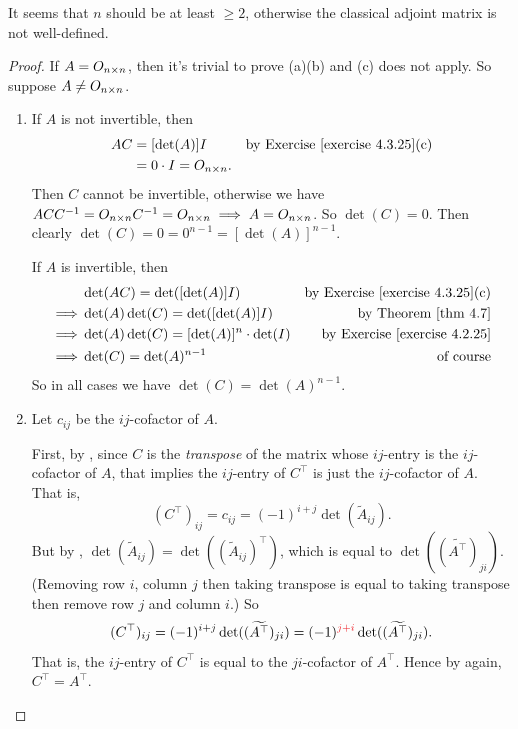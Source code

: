 \begin{note}
It seems that \(n\) should be at least \(\ge 2\), otherwise the classical adjoint matrix is not well-defined.
\end{note}

\begin{proof}
If \(A = O_{n \times n}\), then it's trivial to prove (a)(b) and (c) does not apply.
So suppose \(A \ne O_{n \times n}\).

\begin{enumerate}
\item If \(A\) is not invertible, then
\begin{align*}
    AC & = [\det(A)] I & \text{by \EXEC{4.3.25}(c)} \\
       & = 0 \cdot I = O_{n \X n}.
\end{align*}
Then \(C\) cannot be invertible, otherwise we have \(AC C^{-1} = O_{n \times n} C^{-1} = O_{n \times n} \implies A = O_{n \times n}\).
So \(\det(C) = 0\).
Then clearly \(\det(C) = 0 = 0^{n - 1} = [\det(A)]^{n - 1}\).

If \(A\) is invertible, then
\begin{align*}
             & \det(AC) = \det([\det(A)]I) & \text{by \EXEC{4.3.25}(c)} \\
    \implies & \det(A)\det(C) = \det([\det(A)]I) & \text{by \THM{4.7}} \\
    \implies & \det(A)\det(C) = [\det(A)]^n \cdot \det(I) & \text{by \EXEC{4.2.25}} \\
    \implies & \det(C) = \det(A)^{n - 1} & \text{of course}
\end{align*}
So in all cases we have \(\det(C) = \det(A)^{n - 1}\).

\item
Let \(c_{ij}\) be the \(ij\)-cofactor of \(A\).

First, by , since \(C\) is the \emph{transpose} of the matrix whose \(ij\)-entry is the \(ij\)-cofactor of \(A\), that implies the \(ij\)-entry of \(C^\top\) is just the \(ij\)-cofactor of \(A\).
That is,
\[
    (C^\top)_{ij} = c_{ij} = (-1)^{i + j} \det(\tilde{A}_{ij}).
\]
But by , \(\det(\tilde{A}_{ij}) = \det((\widetilde{A}_{ij})^\top)\), which is equal to \(\det((\widetilde{A^\top})_{ji} )\).
(Removing row \(i\), column \(j\) then taking transpose is equal to taking transpose then remove row \(j\) and column \(i\).)
So
\[
    (C^\top)_{ij} = (-1)^{i + j} \det( (\widetilde{A^\top})_{ji} ) = (-1)^{\RED{j + i}} \det( (\widetilde{A^\top})_{ji} ).
\]
That is, the \(ij\)-entry of \(C^\top\) is equal to the \(ji\)-cofactor of \(A^\top\).
Hence by  again, \(C^\top = A^\top\).


\end{enumerate}
\end{proof}
